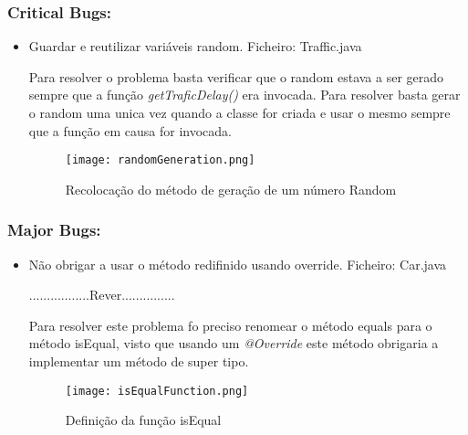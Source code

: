 \subsubsection{Critical Bugs:}
\begin{itemize}
\item Guardar e reutilizar variáveis random.\newline
 Ficheiro: Traffic.java \newline


\par Para resolver o problema basta verificar que o random estava a ser gerado sempre que a função \textit{getTraficDelay()} era invocada. Para resolver basta gerar o random uma unica vez quando a classe for criada e usar o mesmo sempre que a função em causa for invocada.

\begin{figure}[H]

  \centering

  \texttt{[image: randomGeneration.png]}

  \caption {Recolocação do método de geração de um número Random}

  \label {fig06}

\end{figure}
\end{itemize}

\subsubsection{Major Bugs:}
\begin{itemize}
\item Não obrigar a usar o método redifinido usando override.\newline
 Ficheiro: Car.java\newline


.................Rever...............
\par Para resolver este problema fo preciso renomear o método equals para o método isEqual, visto que usando um \textit{@Override} este método obrigaria a implementar um método de super tipo.

\begin{figure}[H]

  \centering

  \texttt{[image: isEqualFunction.png]}

  \caption {Definição da função isEqual}

  \label {fig07}

\end{figure}

\end{itemize}

